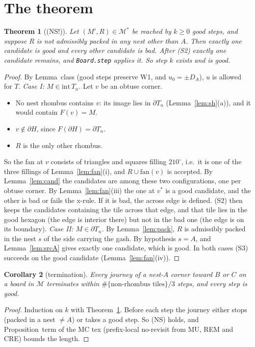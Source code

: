 \documentclass[11pt]{article}
\newtheorem{theorem}{Theorem}\newtheorem{lemma}[theorem]{Lemma}\newtheorem{proposition}[theorem]{Proposition}
\newtheorem{corollary}[theorem]{Corollary}
\theoremstyle{definition}\newtheorem{definition}[theorem]{Definition}\newtheorem{remark}[theorem]{Remark}
\newcommand{\M}{\mathcal M}
\begin{document}
\section{The theorem}\label{sec:thm}
\begin{theorem}[(NS!)]\label{thm:ns}
Let $(M',R)\in\M^*$ be reached by $k\ge0$ \emph{good} steps, and suppose $R$ is not admissibly packed in any nest other than $A$. Then exactly one candidate is good and every other candidate is bad. After (S2) exactly one candidate remains, and \texttt{Board.step} applies it. So step $k$ exists and is good.
\end{theorem}
\begin{proof}
By Lemma~class (good steps preserve W1, and $u_0=\pm D_A$), $u$ is allowed for $T$.
\emph{Case I: $M\in\mathrm{int}\,T_n$.} Let $v$ be an obtuse corner.
\begin{itemize}
\item No nest rhombus contains $v$: its image lies in $\partial T_n$ (Lemma~\ref{lem:sh}(a)), and it would contain $F(v)=M$.
\item $v\notin\partial H$, since $F(\partial H)=\partial T_n$.
\item $R$ is the only other rhombus.
\end{itemize}
So the fan at $v$ consists of triangles and squares filling $210^\circ$, i.e.\ it is one of the three fillings of Lemma~\ref{lem:fan}(i), and $R\cup\mathrm{fan}(v)$ is accepted. By Lemma~\ref{lem:cand} the candidates are among these two configurations, one per obtuse corner. By Lemma~\ref{lem:fan}(iii) the one at $v^*$ is a good candidate, and the other is bad or fails the x-rule. If it is bad, the across edge is defined. (S2) then keeps the candidates containing the tile across that edge, and that tile lies in the good hexagon (the edge is interior there) but not in the bad one (the edge is on its boundary).
\emph{Case II: $M\in\partial T_n$.} By Lemma~\ref{lem:pack}, $R$ is admissibly packed in the nest $s$ of the side carrying the gash. By hypothesis $s=A$, and Lemma~\ref{lem:srcA} gives exactly one candidate, which is good.
In both cases (S3) succeeds on the good candidate (Lemma~\ref{lem:fan}(iv)).
\end{proof}

\begin{corollary}[termination]\label{cor:term}
Every journey of a nest-$A$ corner toward $B$ or $C$ on a board in $\M$ terminates within $\#\{\text{non-rhombus tiles}\}/3$ steps, and every step is good.
\end{corollary}
\begin{proof}
Induction on $k$ with Theorem~\ref{thm:ns}. Before each step the journey either stops (packed in a nest $\ne A$) or takes a good step. So (NS) holds, and Proposition~term of the MC tex (prefix-local no-revisit from MU, REM and CRE) bounds the length.
\end{proof}
\end{document}
